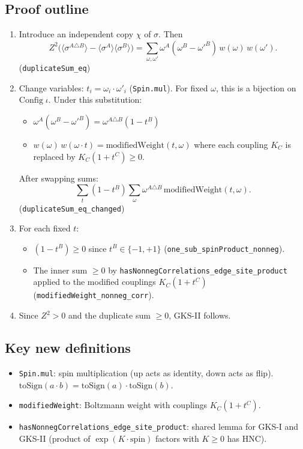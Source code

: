 \documentclass[a4paper,11pt]{article}
\begin{document}
\subsection{Proof outline}

\begin{enumerate}
\item Introduce an independent copy $\chi$ of $\sigma$. Then
  \[
    Z^2\bigl(\langle\sigma^{A\triangle B}\rangle
      - \langle\sigma^A\rangle\langle\sigma^B\rangle\bigr)
    = \sum_{\omega,\omega'} \omega^A(\omega^B - \omega'^B)\,w(\omega)\,w(\omega').
  \]
  (\texttt{duplicateSum\_eq})

\item Change variables: $t_i = \omega_i \cdot \omega'_i$
  (\texttt{Spin.mul}). For fixed $\omega$, this is a bijection on
  $\mathrm{Config}\;\iota$. Under this substitution:
  \begin{itemize}
    \item $\omega^A(\omega^B - \omega'^B) = \omega^{A\triangle B}(1 - t^B)$
    \item $w(\omega)\,w(\omega\cdot t) = \mathrm{modifiedWeight}(t, \omega)$
      where each coupling $K_C$ is replaced by $K_C(1 + t^C) \geq 0$.
  \end{itemize}
  After swapping sums:
  \[
    \sum_t (1 - t^B) \sum_\omega \omega^{A\triangle B}\,
      \mathrm{modifiedWeight}(t, \omega).
  \]
  (\texttt{duplicateSum\_eq\_changed})

\item For each fixed $t$:
  \begin{itemize}
    \item $(1 - t^B) \geq 0$ since $t^B \in \{-1,+1\}$
      (\texttt{one\_sub\_spinProduct\_nonneg}).
    \item The inner sum $\geq 0$ by
      \texttt{hasNonnegCorrelations\_edge\_site\_product} applied to
      the modified couplings $K_C(1 + t^C)$
      (\texttt{modifiedWeight\_nonneg\_corr}).
  \end{itemize}

\item Since $Z^2 > 0$ and the duplicate sum $\geq 0$, GKS-II follows.
\end{enumerate}

\subsection{Key new definitions}

\begin{itemize}
  \item \texttt{Spin.mul}: spin multiplication ($\mathrm{up}$ acts as
    identity, $\mathrm{down}$ acts as flip).
    $\mathrm{toSign}(a \cdot b) = \mathrm{toSign}(a) \cdot \mathrm{toSign}(b)$.
  \item \texttt{modifiedWeight}: Boltzmann weight with couplings
    $K_C(1 + t^C)$.
  \item \texttt{hasNonnegCorrelations\_edge\_site\_product}: shared
    lemma for GKS-I and GKS-II (product of $\exp(K \cdot \text{spin})$
    factors with $K \geq 0$ has HNC).
\end{itemize}
\end{document}
